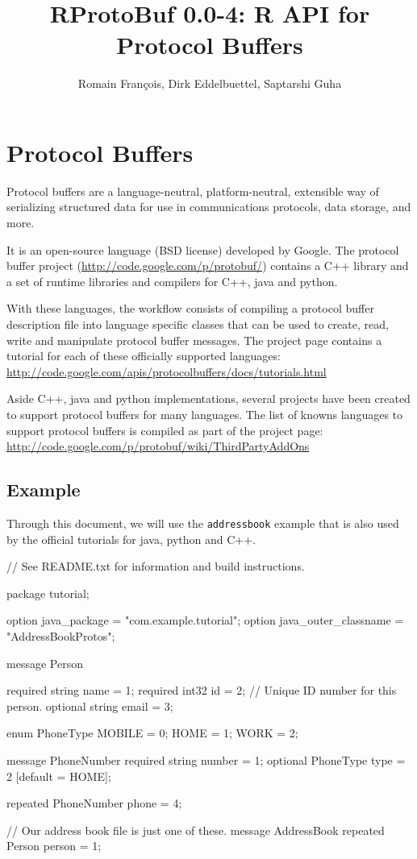 \documentclass{article}
\author{Romain Fran\c{c}ois, Dirk Eddelbuettel, Saptarshi Guha}
\title{RProtoBuf 0.0-4: R API for Protocol Buffers}
\begin{document}
\maketitle

\section{Protocol Buffers}

Protocol buffers are a language-neutral, platform-neutral, extensible 
way of serializing structured data for use in communications 
protocols, data storage, and more. 

It is an open-source language (BSD license) developed by Google. The 
protocol buffer project (\url{http://code.google.com/p/protobuf/})
contains a C++ library and a set of runtime libraries and compilers for
C++, java and python. 

With these languages, the workflow consists of 
compiling a protocol buffer description file into
language specific classes that can be used to create, read, write and 
manipulate protocol buffer messages. The project page contains a tutorial
for each of these officially supported languages:
\url{http://code.google.com/apis/protocolbuffers/docs/tutorials.html}

Aside C++, java and python implementations, several projects have been 
created to support protocol buffers for many languages. The list of knowns
languages to support protocol buffers is compiled as part of the
project page: \url{http://code.google.com/p/protobuf/wiki/ThirdPartyAddOns}

\subsection{Example}

Through this document, we will use the \texttt{addressbook} example
that is also used by the official tutorials for java, python and C++. 

\begin{Schunk}
\begin{Soutput}
// See README.txt for information and build instructions.

package tutorial;

option java_package = "com.example.tutorial";
option java_outer_classname = "AddressBookProtos";

message Person {
  required string name = 1;
  required int32 id = 2;        // Unique ID number for this person.
  optional string email = 3;

  enum PhoneType {
    MOBILE = 0;
    HOME = 1;
    WORK = 2;
  }

  message PhoneNumber {
    required string number = 1;
    optional PhoneType type = 2 [default = HOME];
  }

  repeated PhoneNumber phone = 4;
}

// Our address book file is just one of these.
message AddressBook {
  repeated Person person = 1;
}
\end{Soutput}
\end{Schunk}
\end{document}
